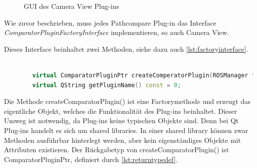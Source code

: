 \begin{figure}[t]
  \begin{center}
  \end{center}
  \caption{GUI des Camera View Plug-ins}
  \label{fig:cameraview}
\end{figure}

Wie zuvor beschrieben, muss jedes Pathcompare Plug-in das Interface
\textit{ComparatorPluginFactoryInterface} implementieren, so auch Camera View.

Dieses Interface beinhaltet zwei Methoden, siehe dazu auch
\autoref{lst:factoryinterface}.

\begin{lstlisting}[caption=Interfacemethoden - Plug-ins müssen diese implementieren , language=C++, basicstyle=\footnotesize, label=lst:factoryinterface]

        virtual ComparatorPluginPtr createComperatorPlugin(ROSManager * ros_manager, QWidget *tab_widget) const = 0;
        virtual QString getPluginName() const = 0;

\end{lstlisting}

Die Methode createComparatorPlugin() ist eine Factorymethode und erzeugt das
eigentliche Objekt, welches die Funktionalität des Plug-ins beinhaltet. Dieser
Umweg ist notwendig, da Plug-ins keine typischen Objekte sind. Denn bei
Qt Plug-ins handelt es sich um shared libraries. In einer shared library können
zwar Methoden ausführbar hinterlegt werden, aber kein eigenständiges Objekte
mit Attributen existieren. Der Rückgabetyp von createComparatorPlugin() ist
ComparatorPluginPtr, definiert durch \autoref{lst:returntypedef}.

